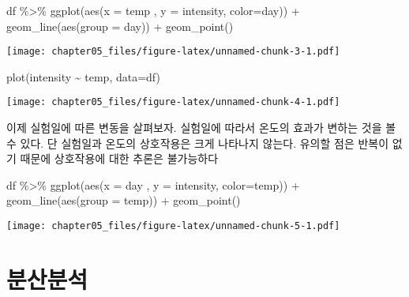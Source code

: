 \documentclass[
]{book}
\newenvironment{Shaded}{\begin{snugshade}}{\end{snugshade}}
\newcommand{\AttributeTok}[1]{\textcolor[rgb]{0.77,0.63,0.00}{#1}}
\newcommand{\FunctionTok}[1]{\textcolor[rgb]{0.00,0.00,0.00}{#1}}
\newcommand{\NormalTok}[1]{#1}
\newcommand{\SpecialCharTok}[1]{\textcolor[rgb]{0.00,0.00,0.00}{#1}}
\begin{document}
\begin{Shaded}
\begin{Highlighting}[]
\NormalTok{df }\SpecialCharTok{\%\textgreater{}\%} 
  \FunctionTok{ggplot}\NormalTok{(}\FunctionTok{aes}\NormalTok{(}\AttributeTok{x =}\NormalTok{ temp  , }\AttributeTok{y =}\NormalTok{ intensity,  }\AttributeTok{color=}\NormalTok{day)) }\SpecialCharTok{+}
   \FunctionTok{geom\_line}\NormalTok{(}\FunctionTok{aes}\NormalTok{(}\AttributeTok{group =}\NormalTok{ day)) }\SpecialCharTok{+}   \FunctionTok{geom\_point}\NormalTok{()}
\end{Highlighting}
\end{Shaded}

\texttt{[image: chapter05\_files/figure-latex/unnamed-chunk-3-1.pdf]}

\begin{Shaded}
\begin{Highlighting}[]
\FunctionTok{plot}\NormalTok{(intensity }\SpecialCharTok{\textasciitilde{}}\NormalTok{ temp, }\AttributeTok{data=}\NormalTok{df)}
\end{Highlighting}
\end{Shaded}

\texttt{[image: chapter05\_files/figure-latex/unnamed-chunk-4-1.pdf]}

이제 실험일에 따른 변동을 살펴보자. 실험일에 따라서 온도의 효과가 변하는 것을 볼 수 있다.
단 실험일과 온도의 상호작용은 크게 나타나지 않는다. 유의할 점은 반복이 없기 때문에 상호작용에 대한 추론은 불가능하다

\begin{Shaded}
\begin{Highlighting}[]
\NormalTok{df }\SpecialCharTok{\%\textgreater{}\%} 
  \FunctionTok{ggplot}\NormalTok{(}\FunctionTok{aes}\NormalTok{(}\AttributeTok{x =}\NormalTok{ day  , }\AttributeTok{y =}\NormalTok{ intensity,  }\AttributeTok{color=}\NormalTok{temp)) }\SpecialCharTok{+}
   \FunctionTok{geom\_line}\NormalTok{(}\FunctionTok{aes}\NormalTok{(}\AttributeTok{group =}\NormalTok{ temp)) }\SpecialCharTok{+}   \FunctionTok{geom\_point}\NormalTok{()}
\end{Highlighting}
\end{Shaded}

\texttt{[image: chapter05\_files/figure-latex/unnamed-chunk-5-1.pdf]}

\hypertarget{uxbd84uxc0b0uxbd84uxc11d}{%
\section{분산분석}\label{uxbd84uxc0b0uxbd84uxc11d}}
\end{document}

